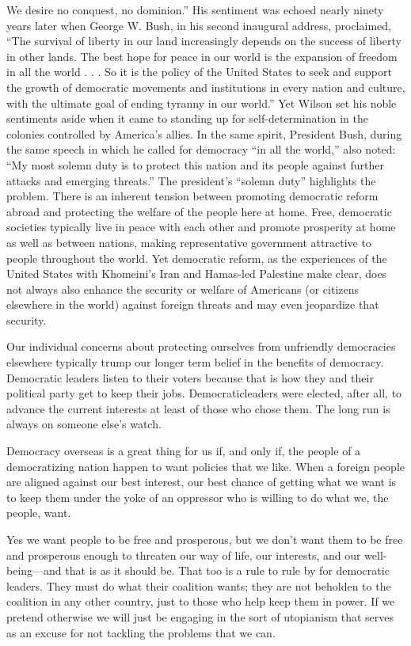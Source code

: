 \documentclass[10pt]{article}
\begin{document}
{\large We desire no conquest, no dominion.'' His sentiment was echoed nearly
ninety years later when George W. Bush, in his second inaugural address,
proclaimed, ``The survival of liberty in our land increasingly depends on the
success of liberty in other lands. The best hope for peace in our world is the
expansion of freedom in all the world . . . So it is the policy of the United
States to seek and support the growth of democratic movements and institutions in
every nation and culture, with the ultimate goal of ending tyranny in our
world.'' Yet Wilson set his noble sentiments aside when it came to standing up
for self-determination in the colonies controlled by America's allies. In the
same spirit, President Bush, during the same speech in which he called for
democracy ``in all the world,'' also noted: ``My most solemn duty is to protect
this nation and its people against further attacks and emerging threats.'' The
president's ``solemn duty'' highlights the problem. There is an inherent tension
between promoting democratic reform abroad and protecting the welfare of the
people here at home. Free, democratic societies typically live in peace with each
other and promote prosperity at home as well as between nations, making
representative government attractive to people throughout the world. Yet
democratic reform, as the experiences of the United States with Khomeini's Iran
and Hamas-led Palestine make clear, does not always also enhance the security or
welfare of Americans (or citizens elsewhere in the world) against foreign threats
and may even jeopardize that security.}

{\large Our individual concerns about protecting ourselves from unfriendly
democracies elsewhere typically trump our longer term belief in the benefits of
democracy. Democratic leaders listen to their voters because that is how they and
their political party get to keep their jobs. Democraticleaders were elected,
after all, to advance the current interests at least of those who chose them. The
long run is always on someone else's watch.}

{\large Democracy overseas is a great thing for us if, and only if, the people
of a democratizing nation happen to want policies that we like. When a foreign
people are aligned against our best interest, our best chance of getting what we
want is to keep them under the yoke of an oppressor who is willing to do what we,
the people, want.}

{\large Yes we want people to be free and prosperous, but we don't want them to
be free and prosperous enough to threaten our way of life, our interests, and our
well-being---and that is as it should be. That too is a rule to rule by for
democratic leaders. They must do what their coalition wants; they are not
beholden to the coalition in any other country, just to those who help keep them
in power. If we pretend otherwise we will just be engaging in the sort of
utopianism that serves as an excuse for not tackling the problems that we can.}
\end{document}
